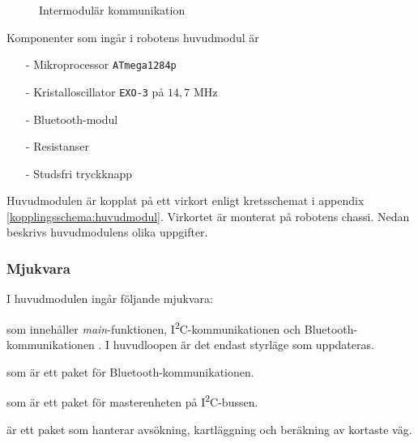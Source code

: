 \documentclass[11pt]{article}
\begin{document}
\begin{flushleft}
\begin{figure}[htbp]
\noindent\resizebox{.97\textwidth}{!}{
	}
	\caption{Intermodulär kommunikation \label{communication}}
\end{figure}

Komponenter som ingår i robotens huvudmodul är 
\begin{itemize}
  \item[-] Mikroprocessor \verb+ATmega1284p+
  \item[-] Kristalloscillator \verb+EXO-3+ på $14,7$ MHz
  \item[-] Bluetooth\textsuperscript{\circledR}-modul
  \item[-] Resistanser
  \item[-] Studsfri tryckknapp
\end{itemize}

Huvudmodulen är kopplat  på ett virkort enligt kretsschemat i appendix \ref{kopplingsschema:huvudmodul}. Virkortet  är monterat på robotens chassi. Nedan beskrivs huvudmodulens olika uppgifter.

\subsubsection{Mjukvara}
I huvudmodulen ingår följande mjukvara:

\begin{description}[style=unboxed, leftmargin=0cm]
  \item[huvudMain.c] som innehåller \textit{main}-funktionen, I\textsuperscript{2}C-kommunikationen och Bluetooth\textsuperscript{\circledR}-kommunikationen . I huvudloopen är det endast styrläge som uppdateras.
  \item[bluetooth.h] som är ett paket för Bluetooth\textsuperscript{\circledR}-kommunikationen.
  \item[I2C\_master.h] som är ett paket för masterenheten på I\textsuperscript{2}C-bussen.
  \item[searchPath.h] är ett paket som hanterar avsökning, kartläggning och beräkning av kortaste väg.
\end{description}


\end{flushleft}
\end{document}
